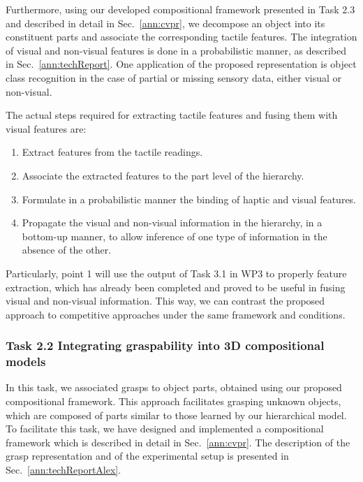 \documentclass[a4paper,11pt,pdf]{pacmanreport}
\begin{document}
Furthermore, using our developed compositional framework presented in Task 2.3 and described in detail in Sec.~\ref{ann:cvpr}, we decompose an object into its constituent parts and associate the corresponding tactile features. The integration of visual and non-visual features is done in a probabilistic manner, as described in Sec.~\ref{ann:techReport}. One application of the proposed representation is object class recognition in the case of partial or missing sensory data, either visual or non-visual.

The actual steps required for extracting tactile features and fusing them with visual features are:

\begin{enumerate}

\item Extract features from the tactile readings.
\item Associate the extracted features to the part level of the hierarchy.
\item Formulate in a probabilistic manner the binding of haptic and visual features.
\item Propagate the visual and non-visual information in the
  hierarchy, in a bottom-up manner, to allow inference of one type of
  information in the absence of the other.
\end{enumerate}


Particularly, point 1 will use the output of Task 3.1 in WP3 to properly feature extraction, which has already been completed and proved to be useful in fusing visual and non-visual information. This way, we can contrast the proposed approach to competitive approaches under the same framework and conditions.

\subsubsection{Task 2.2 Integrating graspability into 3D compositional models}

In this task, we associated grasps to object parts, obtained using our proposed compositional framework. This approach facilitates grasping unknown objects, which are composed of parts similar to those learned by our hierarchical model. To facilitate this task, we have designed and implemented a compositional framework which is described in detail in Sec.~\ref{ann:cvpr}. The description of the grasp representation and of the experimental setup is presented in Sec.~\ref{ann:techReportAlex}.
\end{document}

